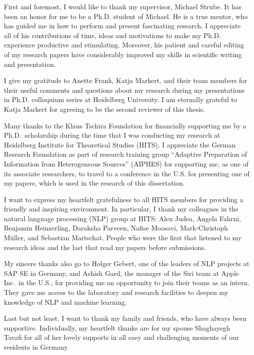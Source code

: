 
First and foremost, I would like to thank my supervisor, Michael Strube. 
It has been an honor for me to be a Ph.D. student of Michael. 
He is a true mentor, who has guided me in how to perform and present fascinating research. 
I appreciate all of his contributions of time, ideas and motivations to make my Ph.D. experience productive and stimulating. 
Moreover, his patient and careful editing of my research papers have considerably improved my skills in scientific writing and presentation. 

I give my gratitude to Anette Frank, Katja Markert, and their team members for their useful comments and questions about my research during my presentations in Ph.D. colloquium series at Heidelberg University.  
I am eternally grateful to Katja Markert for agreeing to be the second reviewer of this thesis. 

Many thanks to the Klaus Tschira Foundation for financially supporting me by a Ph.D.\ scholarship during the time that I was conducting my research at Heidelberg Institute for Theoretical Studies (HITS). 
I appreciate the German Research Foundation as part of research training group “Adaptive Preparation of Information from Heterogeneous Sources” (AIPHES) for supporting me, as one of its associate researchers, to travel to a conference in the U.S. for presenting one of my papers, which is used in the research of this dissertation.   

I want to express my heartfelt gratefulness to all HITS members for providing a friendly and inspiring environment. 
In particular, I thank my colleagues in the natural language processing (NLP) group at HITS:
Alex Judea, Angela Fahrni, Benjamin Heinzerling, Daraksha Parveen, Nafise Moosavi, \mbox{Mark-Christoph} M{\"u}ller, and Sebastian Martschat.  
People who were the first that listened to my research ideas and the last that read my papers before submissions. 

My sincere thanks also go to Holger Gebert, one of the leaders of NLP projects at SAP SE in Germany, and Ashish Gard, the manager of the Siri team at Apple Inc.\ in the U.S., for providing me an opportunity to join their teams as an intern. 
They gave me access to the laboratory and research facilities to deepen my knowledge of NLP and machine learning. 

Last but not least, I want to thank my family and friends, who have always been supportive. 
Individually, my heartfelt thanks are for my spouse Shaghayegh Tavafi for all of her lovely supports in all easy and challenging moments of our residents in Germany. 